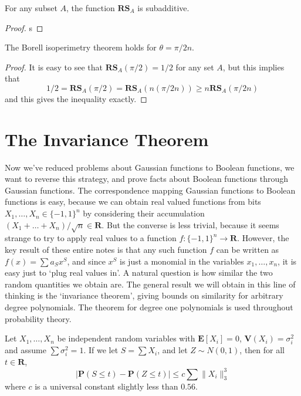 \begin{lemma}
    For any subset $A$, the function $\mathbf{RS}_A$ is subadditive.
\end{lemma}
\begin{proof}
    s
\end{proof}

\begin{corollary}
    The Borell isoperimetry theorem holds for $\theta = \pi/2n$.
\end{corollary}
\begin{proof}
    It is easy to see that $\mathbf{RS}_A(\pi/2) = 1/2$ for any set $A$, but this implies that
    \[ 1/2 = \mathbf{RS}_A(\pi/2) = \mathbf{RS}_A(n (\pi/2n)) \geq n \mathbf{RS}_A(\pi/2n) \]
    and this gives the inequality exactly.
\end{proof}

\section{The Invariance Theorem}

Now we've reduced problems about Gaussian functions to Boolean functions, we want to reverse this strategy, and prove facts about Boolean functions through Gaussian functions. The correspondence mapping Gaussian functions to Boolean functions is easy, because we can obtain real valued functions from bits $X_1, \dots, X_n \in \{ -1, 1 \}^n$ by considering their accumulation $(X_1 + \dots + X_n)/\sqrt{n} \in \mathbf{R}$. But the converse is less trivial, because it seems strange to try to apply real values to a function $f: \{ -1, 1 \}^n \to \mathbf{R}$. However, the key result of these entire notes is that any such function $f$ can be written as $f(x) = \sum a_S x^S$, and since $x^S$ is just a monomial in the variables $x_1, \dots, x_n$, it is easy just to `plug real values in'. A natural question is how similar the two random quantities we obtain are. The general result we will obtain in this line of thinking is the `invariance theorem', giving bounds on similarity for arbitrary degree polynomials. The theorem for degree one polynomials is used throughout probability theory.

\begin{theorem}
    Let $X_1, \dots, X_n$ be independent random variables with $\mathbf{E}[X_i] = 0$, $\mathbf{V}(X_i) = \sigma_i^2$ and assume $\sum \sigma_i^2 = 1$. If we let $S = \sum X_i$, and let $Z \sim N(0,1)$, then for all $t \in \mathbf{R}$,
    \[ \left| \mathbf{P}(S \leq t) - \mathbf{P}(Z \leq t) \right| \leq c \sum \| X_i \|_3^3 \]
    where $c$ is a universal constant slightly less than $0.56$.
\end{theorem}

